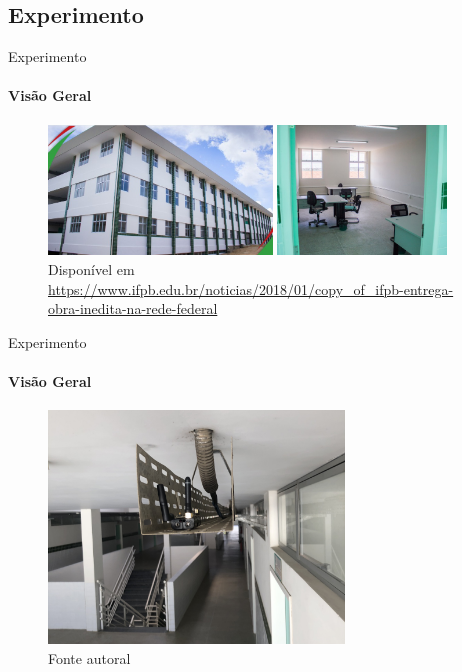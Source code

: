 \documentclass[c]{beamer}
\begin{document}
\begin{darkframes}
  \section{Experimento}
  \begin{frame}{Experimento}
    \framesubtitle{Visão Geral}
    \begin{figure}
      \centering
      \includegraphics[width=0.53\textwidth]{resources/Subtract.jpg}
      \includegraphics[width=0.4\textwidth]{resources/ifpb_sala.jpg}\\
      \footnotesize{Disponível em \url{https://www.ifpb.edu.br/noticias/2018/01/copy_of_ifpb-entrega-obra-inedita-na-rede-federal}}
    \end{figure}
  \end{frame}

  \begin{frame}{Experimento}
    \framesubtitle{Visão Geral}
    \begin{figure}
      \centering
      \includegraphics[width=0.7\textwidth]{resources/tx_canaleta.jpg}\\
      \footnotesize{Fonte autoral}
    \end{figure}
  \end{frame}


\end{darkframes}
\end{document}
